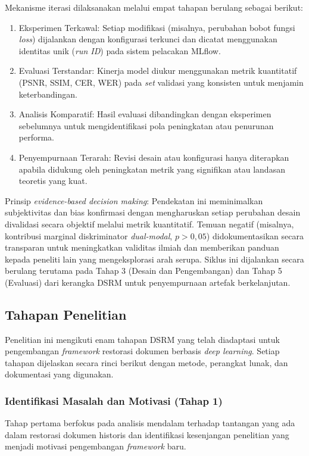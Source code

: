 Mekanisme iterasi dilaksanakan melalui empat tahapan berulang sebagai berikut:
\begin{enumerate}[label=\arabic*., leftmargin=1.5em, labelsep=0.5em, itemindent=0pt, noitemsep, topsep=0pt]
    \item Eksperimen Terkawal: Setiap modifikasi (misalnya, perubahan bobot fungsi \textit{loss}) dijalankan dengan konfigurasi terkunci dan dicatat menggunakan identitas unik (\textit{run ID}) pada sistem pelacakan MLflow.
    \item Evaluasi Terstandar: Kinerja model diukur menggunakan metrik kuantitatif (PSNR, SSIM, CER, WER) pada \textit{set} validasi yang konsisten untuk menjamin keterbandingan.
    \item Analisis Komparatif: Hasil evaluasi dibandingkan dengan eksperimen sebelumnya untuk mengidentifikasi pola peningkatan atau penurunan performa.
    \item Penyempurnaan Terarah: Revisi desain atau konfigurasi hanya diterapkan apabila didukung oleh peningkatan metrik yang signifikan atau landasan teoretis yang kuat.
\end{enumerate}

Prinsip \textit{evidence-based decision making}: Pendekatan ini meminimalkan subjektivitas dan bias konfirmasi dengan mengharuskan setiap perubahan desain divalidasi secara objektif melalui metrik kuantitatif. Temuan negatif (misalnya, kontribusi marginal diskriminator \textit{dual-modal}, $p>0,05$) didokumentasikan secara transparan untuk meningkatkan validitas ilmiah dan memberikan panduan kepada peneliti lain yang mengeksplorasi arah serupa. Siklus ini dijalankan secara berulang terutama pada Tahap 3 (Desain dan Pengembangan) dan Tahap 5 (Evaluasi) dari kerangka DSRM untuk penyempurnaan artefak berkelanjutan.

\subsection{Tahapan Penelitian}
\label{subsec:tahapan-penelitian}

Penelitian ini mengikuti enam tahapan DSRM yang telah diadaptasi untuk pengembangan \textit{framework} restorasi dokumen berbasis \textit{deep learning}. Setiap tahapan dijelaskan secara rinci berikut dengan metode, perangkat lunak, dan dokumentasi yang digunakan.

\subsubsection{Identifikasi Masalah dan Motivasi (Tahap 1)}
Tahap pertama berfokus pada analisis mendalam terhadap tantangan yang ada dalam restorasi dokumen historis dan identifikasi kesenjangan penelitian yang menjadi motivasi pengembangan \textit{framework} baru.


